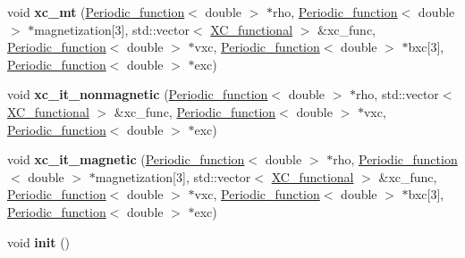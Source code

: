 \begin{DoxyCompactItemize}
\item 
\hypertarget{classsirius_1_1_potential_a9dd2d9a79897292706a4ca8a78cd0271}{}void {\bfseries xc\+\_\+mt} (\hyperlink{classsirius_1_1_periodic__function}{Periodic\+\_\+function}$<$ double $>$ $\ast$rho, \hyperlink{classsirius_1_1_periodic__function}{Periodic\+\_\+function}$<$ double $>$ $\ast$magnetization\mbox{[}3\mbox{]}, std\+::vector$<$ \hyperlink{classsirius_1_1_x_c__functional}{X\+C\+\_\+functional} $>$ \&xc\+\_\+func, \hyperlink{classsirius_1_1_periodic__function}{Periodic\+\_\+function}$<$ double $>$ $\ast$vxc, \hyperlink{classsirius_1_1_periodic__function}{Periodic\+\_\+function}$<$ double $>$ $\ast$bxc\mbox{[}3\mbox{]}, \hyperlink{classsirius_1_1_periodic__function}{Periodic\+\_\+function}$<$ double $>$ $\ast$exc)\label{classsirius_1_1_potential_a9dd2d9a79897292706a4ca8a78cd0271}

\item 
\hypertarget{classsirius_1_1_potential_a599c0a7539faf2afab6df28fe71d3e13}{}void {\bfseries xc\+\_\+it\+\_\+nonmagnetic} (\hyperlink{classsirius_1_1_periodic__function}{Periodic\+\_\+function}$<$ double $>$ $\ast$rho, std\+::vector$<$ \hyperlink{classsirius_1_1_x_c__functional}{X\+C\+\_\+functional} $>$ \&xc\+\_\+func, \hyperlink{classsirius_1_1_periodic__function}{Periodic\+\_\+function}$<$ double $>$ $\ast$vxc, \hyperlink{classsirius_1_1_periodic__function}{Periodic\+\_\+function}$<$ double $>$ $\ast$exc)\label{classsirius_1_1_potential_a599c0a7539faf2afab6df28fe71d3e13}

\item 
\hypertarget{classsirius_1_1_potential_a0356021fa84663766fa310670f081828}{}void {\bfseries xc\+\_\+it\+\_\+magnetic} (\hyperlink{classsirius_1_1_periodic__function}{Periodic\+\_\+function}$<$ double $>$ $\ast$rho, \hyperlink{classsirius_1_1_periodic__function}{Periodic\+\_\+function}$<$ double $>$ $\ast$magnetization\mbox{[}3\mbox{]}, std\+::vector$<$ \hyperlink{classsirius_1_1_x_c__functional}{X\+C\+\_\+functional} $>$ \&xc\+\_\+func, \hyperlink{classsirius_1_1_periodic__function}{Periodic\+\_\+function}$<$ double $>$ $\ast$vxc, \hyperlink{classsirius_1_1_periodic__function}{Periodic\+\_\+function}$<$ double $>$ $\ast$bxc\mbox{[}3\mbox{]}, \hyperlink{classsirius_1_1_periodic__function}{Periodic\+\_\+function}$<$ double $>$ $\ast$exc)\label{classsirius_1_1_potential_a0356021fa84663766fa310670f081828}

\item 
\hypertarget{classsirius_1_1_potential_a8b987c41157fb2d5da2d435548aad410}{}void {\bfseries init} ()\label{classsirius_1_1_potential_a8b987c41157fb2d5da2d435548aad410}

\end{DoxyCompactItemize}
